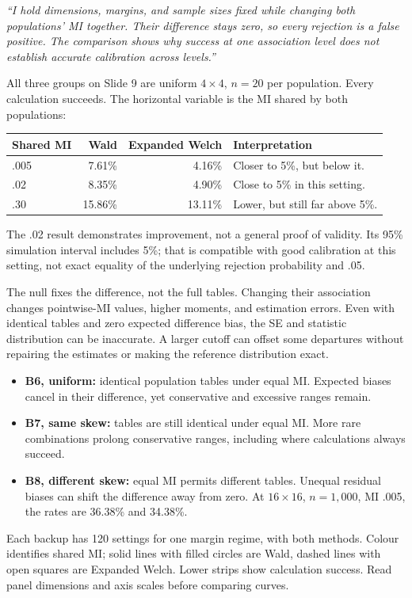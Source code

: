 \newpage
{}

\emph{``I hold dimensions, margins, and sample sizes fixed while changing both populations' MI together. Their difference stays zero, so every rejection is a false positive. The comparison shows why success at one association level does not establish accurate calibration across levels.''}

All three groups on Slide 9 are uniform \(4\times4\), \(n=20\) per population. Every calculation succeeds. The horizontal variable is the MI shared by both populations:
\begin{center}
\begin{tabular}{@{}lrrl@{}}
\toprule
\textbf{Shared MI} & \textbf{Wald} & \textbf{Expanded Welch} & \textbf{Interpretation}\\
\midrule
.005 & 7.61\% & 4.16\% & Closer to 5\%, but below it.\\
.02 & 8.35\% & 4.90\% & Close to 5\% in this setting.\\
.30 & 15.86\% & 13.11\% & Lower, but still far above 5\%.\\
\bottomrule
\end{tabular}
\end{center}
The .02 result demonstrates improvement, not a general proof of validity. Its 95\% simulation interval includes 5\%; that is compatible with good calibration at this setting, not exact equality of the underlying rejection probability and .05.

The null fixes the difference, not the full tables. Changing their association changes pointwise-MI values, higher moments, and estimation errors. Even with identical tables and zero expected difference bias, the SE and statistic distribution can be inaccurate. A larger cutoff can offset some departures without repairing the estimates or making the reference distribution exact.

\begin{itemize}
\item \textbf{B6, uniform:} identical population tables under equal MI. Expected biases cancel in their difference, yet conservative and excessive ranges remain.
\item \textbf{B7, same skew:} tables are still identical under equal MI. More rare combinations prolong conservative ranges, including where calculations always succeed.
\item \textbf{B8, different skew:} equal MI permits different tables. Unequal residual biases can shift the difference away from zero. At \(16\times16\), \(n=1{,}000\), MI .005, the rates are 36.38\% and 34.38\%.
\end{itemize}
Each backup has 120 settings for one margin regime, with both methods. Colour identifies shared MI; solid lines with filled circles are Wald, dashed lines with open squares are Expanded Welch. Lower strips show calculation success. Read panel dimensions and axis scales before comparing curves.

